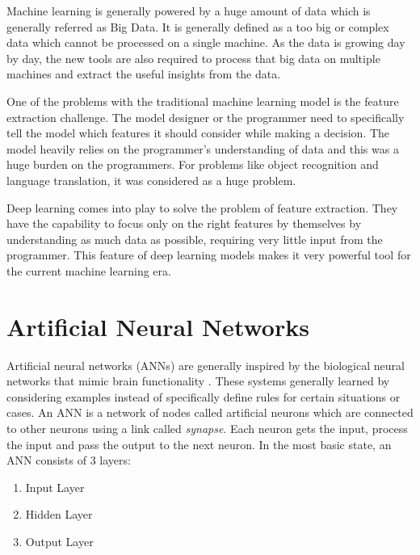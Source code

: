 Machine learning is generally powered by a huge amount of data which is generally referred as Big Data. It is generally defined as a too big or complex data which cannot be processed on a single machine. As the data is growing day by day, the new tools are also required to process that big data on multiple machines and extract the useful insights from the data.


One of the problems with the traditional machine learning model is the feature extraction challenge. The model designer or the programmer need to specifically tell the model which features it should consider while making a decision. The model heavily relies on the programmer's understanding of data and this was a huge burden on the programmers. For problems like object recognition and language translation, it was considered as a huge problem.

Deep learning comes into play to solve the problem of feature extraction. They have the capability to focus only on the right features by themselves by understanding as much data as possible, requiring very little input from the programmer. This feature of deep learning models makes it very powerful tool for the current machine learning era.


\section{Artificial Neural Networks}
Artificial neural networks (ANNs) are generally inspired by the biological neural networks that mimic brain functionality \cite{wiki:ann}. These systems generally learned by considering examples instead of specifically define rules for certain situations or cases. An ANN is a network of nodes called artificial neurons which are connected to other neurons using a link called \textit{synapse}. Each neuron gets the input, process the input and pass the output to the next neuron.
In the most basic state, an ANN consists of 3 layers:

\begin{enumerate}
	\item Input Layer
	\item Hidden Layer
	\item Output Layer
\end{enumerate}

